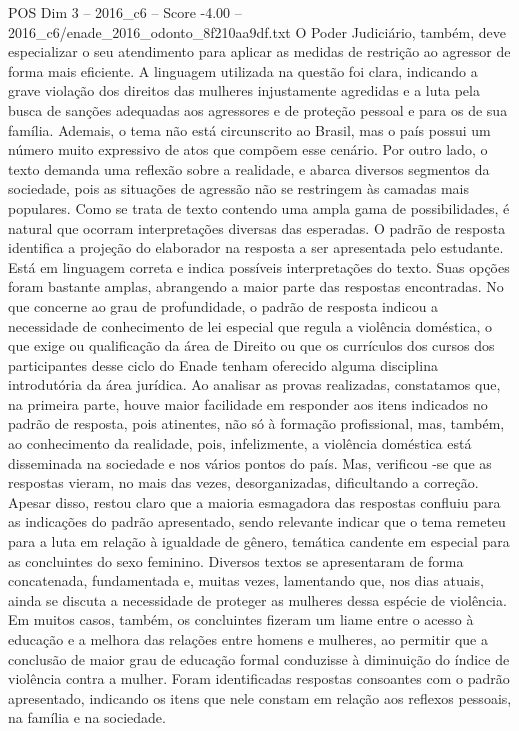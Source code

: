 \begin{textsample}{POS Dim 3 – 2016\_c6 – Score -4.00 – 2016\_c6/enade\_2016\_odonto\_8f210aa9df.txt}
O Poder Judiciário, também, deve especializar o seu atendimento para aplicar as medidas de restrição ao agressor de forma mais eficiente.
A linguagem utilizada na questão foi clara, indicando a grave violação dos direitos das mulheres injustamente agredidas e a luta pela busca de sanções adequadas aos agressores e de proteção pessoal e para os de sua família.
Ademais, o tema não está circunscrito ao Brasil, mas o país possui um número muito expressivo de atos que compõem esse cenário.
Por outro lado, o texto demanda uma reflexão sobre a realidade, e abarca diversos segmentos da sociedade, pois as situações de agressão não se restringem às camadas mais populares.
Como se trata de texto contendo uma ampla gama de possibilidades, é natural que ocorram interpretações diversas das esperadas.
O padrão de resposta identifica a projeção do elaborador na resposta a ser apresentada pelo estudante.
Está em linguagem correta e indica possíveis interpretações do texto.
Suas opções foram bastante amplas, abrangendo a maior parte das respostas encontradas.
No que concerne ao grau de profundidade, o padrão de resposta indicou a necessidade de conhecimento de lei especial que regula a violência doméstica, o que exige ou qualificação da área de Direito ou que os currículos dos cursos dos participantes desse ciclo do Enade tenham oferecido alguma disciplina introdutória da área jurídica.
Ao analisar as provas realizadas, constatamos que, na primeira parte, houve maior facilidade em responder aos itens indicados no padrão de resposta, pois atinentes, não só à formação profissional, mas, também, ao conhecimento da realidade, pois, infelizmente, a violência doméstica está disseminada na sociedade e nos vários pontos do país.
Mas, verificou -se que as respostas vieram, no mais das vezes, desorganizadas, dificultando a correção.
Apesar disso, restou claro que a maioria esmagadora das respostas confluiu para as indicações do padrão apresentado, sendo relevante indicar que o tema remeteu para a luta em relação à igualdade de gênero, temática candente em especial para as concluintes do sexo feminino.
Diversos textos se apresentaram de forma concatenada, fundamentada e, muitas vezes, lamentando que, nos dias atuais, ainda se discuta a necessidade de proteger as mulheres dessa espécie de violência.
Em muitos casos, também, os concluintes fizeram um liame entre o acesso à educação e a melhora das relações entre homens e mulheres, ao permitir que a conclusão de maior grau de educação formal conduzisse à diminuição do índice de violência contra a mulher.
Foram identificadas respostas consoantes com o padrão apresentado, indicando os itens que nele constam em relação aos reflexos pessoais, na família e na sociedade.

\end{textsample}
